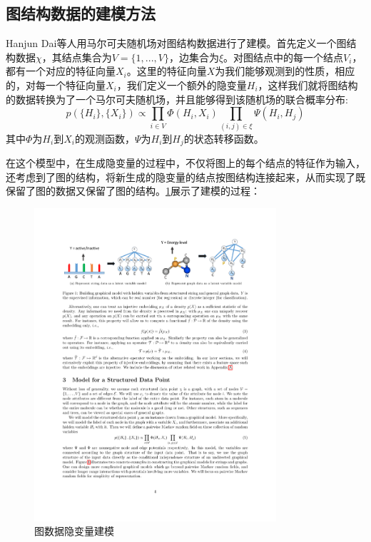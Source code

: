 \subsection{图结构数据的建模方法}
Hanjun Dai\cite{dai2016discriminative}等人用马尔可夫随机场对图结构数据进行了建模。首先定义一个图结构数据$\chi$，其结点集合为$\mathit{V}=\{1,...,V\}$，边集合为$\xi$。对图结点中的每一个结点$V_i$，都有一个对应的特征向量$X_i$。这里的特征向量$X$为我们能够观测到的性质，相应的，对每一个特征向量$X_i$，我们定义一个额外的隐变量$H_i$，这样我们就将图结构的数据转换为了一个马尔可夫随机场，并且能够得到该随机场的联合概率分布:
\begin{equation}
p(\{H_i\}, \{X_i\}) \propto \prod_{i\in V} \Phi(H_i, X_i)\prod_{(i, j)\in \xi} \Psi(H_i, H_j)
\end{equation}
其中$\Phi$为$H_i$到$X_i$的观测函数，$\Psi$为$H_i$到$H_j$的状态转移函数。
\par 在这个模型中，在生成隐变量的过程中，不仅将图上的每个结点的特征作为输入，还考虑到了图的结构，将新生成的隐变量的结点按图结构连接起来，从而实现了既保留了图的数据又保留了图的结构。\ref{mod}展示了建模的过程：
\begin{figure}[htbp]
	\begin{center}
		\includegraphics[width=0.8\textwidth]{figures//1.pdf}
		\caption{图数据隐变量建模}
		\label{mod}
	\end{center}
\end{figure}
